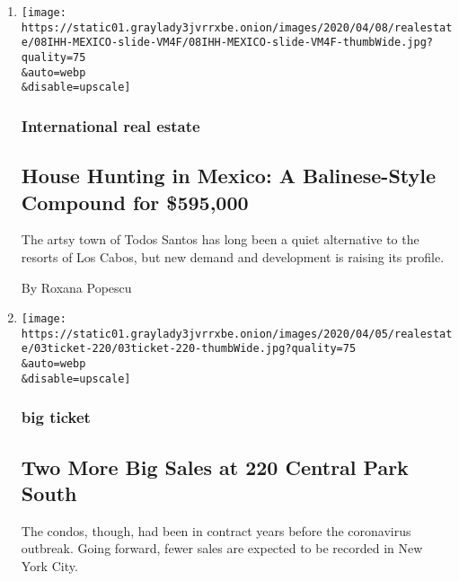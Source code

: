 \begin{enumerate}
\def\labelenumi{\arabic{enumi}.}
\item
  \href{/2020/04/08/realestate/house-hunting-in-mexico-a-balinese-style-compound-for-595000.html}{}

  \texttt{[image: https://static01.graylady3jvrrxbe.onion/images/2020/04/08/realestate/08IHH-MEXICO-slide-VM4F/08IHH-MEXICO-slide-VM4F-thumbWide.jpg?quality=75\\\&auto=webp\\\&disable=upscale]}

  \hypertarget{international-real-estate-2}{%
  \subsubsection{International real
  estate}\label{international-real-estate-2}}

  \hypertarget{house-hunting-in-mexico-a-balinese-style-compound-for-595000-2}{%
  \subsection{House Hunting in Mexico: A Balinese-Style Compound for
  \$595,000}\label{house-hunting-in-mexico-a-balinese-style-compound-for-595000-2}}

  The artsy town of Todos Santos has long been a quiet alternative to
  the resorts of Los Cabos, but new demand and development is raising
  its profile.

  By Roxana Popescu
\item
  \href{/2020/04/03/realestate/two-more-big-sales-at-220-central-park-south.html}{}

  \texttt{[image: https://static01.graylady3jvrrxbe.onion/images/2020/04/05/realestate/03ticket-220/03ticket-220-thumbWide.jpg?quality=75\\\&auto=webp\\\&disable=upscale]}

  \hypertarget{big-ticket-1}{%
  \subsubsection{big ticket}\label{big-ticket-1}}

  \hypertarget{two-more-big-sales-at-220-central-park-south-1}{%
  \subsection{Two More Big Sales at 220 Central Park
  South}\label{two-more-big-sales-at-220-central-park-south-1}}

  The condos, though, had been in contract years before the coronavirus
  outbreak. Going forward, fewer sales are expected to be recorded in
  New York City.


\end{enumerate}

